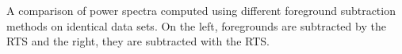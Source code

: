 A comparison of power spectra computed using different foreground subtraction methods on identical data sets. On the left, foregrounds are subtracted by the RTS and the right, they are subtracted with the RTS.